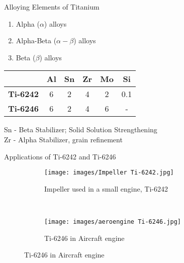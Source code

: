 \documentclass[10pt]{beamer}
\begin{document}
{%

\begin{frame}[fragile]{Alloying Elements of Titanium}

\begin{enumerate}
\item Alpha ($\alpha$) alloys
\item Alpha-Beta ($\alpha-\beta$) alloys
\item Beta ($\beta$) alloys
\end{enumerate}

\begin{table}[]
\centering
\begin{tabular}{@{}cccccc@{}}
\toprule
 & \textbf{Al} & \textbf{Sn} & \textbf{Zr} & \textbf{Mo} & \textbf{Si} \\ \midrule
\textbf{Ti-6242} & 6 & 2 & 4 & 2 & 0.1 \\
\textbf{Ti-6246} & 6 & 2 & 4 & 6 & - \\ \bottomrule
\end{tabular}
\end{table}
Sn - Beta Stabilizer; Solid Solution Strengthening \\
Zr - Alpha Stabilizer, grain refinement
\end{frame}
}

{%
\begin{frame}[fragile]{Applications of Ti-6242 and Ti-6246}

\begin{figure}[H]
    \centering
    \begin{subfigure}{0.45\textwidth}
        \texttt{[image: images/Impeller Ti-6242.jpg]}
        \caption{Impeller used in a small engine, Ti-6242}
        \end{subfigure}
    ~
    \begin{subfigure}{0.45\textwidth}
        \texttt{[image: images/aeroengine Ti-6246.jpg]}
        \caption{Ti-6246 in Aircraft engine}
    \end{subfigure}
  
    
\end{figure}

\end{frame}
}
\end{document}
